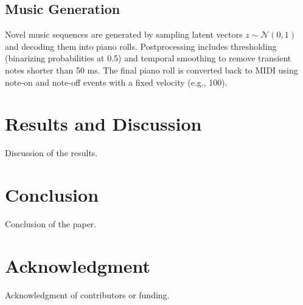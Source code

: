 \documentclass[conference]{IEEEtran}
\begin{document}
\subsection{Music Generation}
Novel music sequences are generated by sampling latent vectors $z \sim \mathcal{N}(0, 1)$ and decoding them into piano rolls. Postprocessing includes thresholding (binarizing probabilities at 0.5) and temporal smoothing to remove transient notes shorter than 50 ms. The final piano roll is converted back to MIDI using note-on and note-off events with a fixed velocity (e.g., 100).



\section{Results and Discussion}
Discussion of the results.

\section{Conclusion}
Conclusion of the paper.

\section*{Acknowledgment}
Acknowledgment of contributors or funding.



\end{document}
